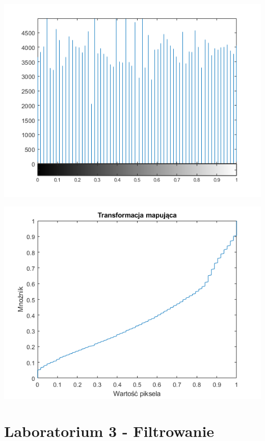 \documentclass{article}
\begin{document}
	\begin{center}
		\includegraphics[width=\linewidth]{../../lab02/cat_eq_hist.png}
		\label{fig:cat_eq_hist}
	\end{center}
	
	\begin{center}
		\includegraphics[width=\linewidth]{../../lab02/cat_eq_map.png}
		\label{fig:cat_eq_map}
	\end{center}
	
	
	\section{Laboratorium 3 - Filtrowanie}
\end{document}
